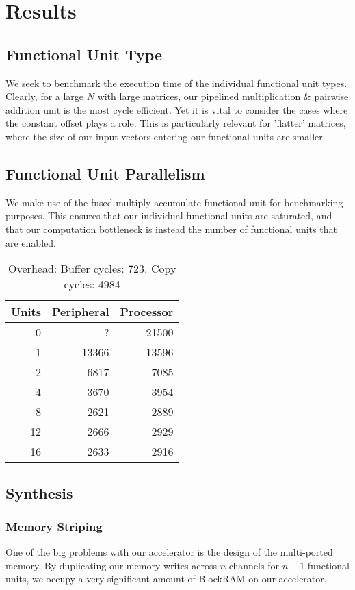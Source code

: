 \documentclass[a4paper,8pt]{report}
\begin{document}
\section{Results}
\subsection{Functional Unit Type}
We seek to benchmark the execution time of the individual functional unit types.
Clearly, for a large $N$ with large matrices, our pipelined multiplication \&
pairwise addition unit is the most cycle efficient. Yet it is vital to consider
the cases where the constant offset plays a role. This is particularly relevant
for 'flatter' matrices, where the size of our input vectors entering our
functional units are smaller.



\subsection{Functional Unit Parallelism}
We make use of the fused multiply-accumulate functional unit for benchmarking
purposes. This ensures that our individual functional units are saturated, and
that our computation bottleneck is instead the number of functional units that
are enabled.

\begin{table}
  \centering
  \begin{tabular}{r|rr}
    \toprule
    Units & Peripheral & Processor \\
    \midrule
    0  &     ? & 21500 \\
    1  & 13366 & 13596 \\
    2  &  6817 &  7085 \\
    4  &  3670 &  3954 \\
    8  &  2621 &  2889 \\
    12 &  2666 &  2929 \\
    16 &  2633 &  2916 \\
    \bottomrule
  \end{tabular}
  \caption{Overhead: Buffer cycles: 723. Copy cycles: 4984}
\end{table}


\subsection{Synthesis}
\subsubsection{Memory Striping}
One of the big problems with our accelerator is the design of the multi-ported
memory. By duplicating our memory writes across $n$ channels for $n-1$
functional units, we occupy a very significant amount of BlockRAM on our
accelerator.
\end{document}
